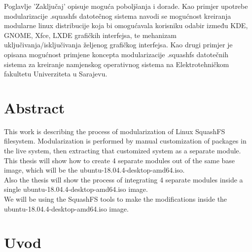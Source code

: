 \documentclass[12pt,vi]{mitthesis}
\begin{document}
\indent
Poglavlje 'Zaključaj' opisuje moguća poboljšanja i dorade. Kao primjer upotrebe modularizacije .squashfs datotečnog sistema navodi se mogućnost kreiranja modularne linux distribucije koja bi omogućavala korisniku odabir između KDE, GNOME, Xfce, LXDE grafičkih interfejsa, te mehanizam uključivanja/isključivanja željenog grafičkog interfejsa. Kao drugi primjer je opisana mogućnost primjene koncepta modularizacije .squashfs datotečnih sistema za kreiranje namjenskog operativnog sistema na Elektrotehničkom fakultetu Univerziteta u Sarajevu.

\chapter*{Abstract}
\indent
This work is describing the process of modularization of Linux SquashFS filesystem. Modularization is performed by manual customization of packages in the live system, then extracting that customized system as a separate module.\\
\noindent
This thesis will show how to create 4 separate modules out of the same base image, which will be the ubuntu-18.04.4-desktop-amd64.iso.\\
\noindent
Also the thesis will show the process of integrating 4 separate modules inside a single ubuntu-18.04.4-desktop-amd64.iso image.\\
\noindent
We will be using the SquashFS tools to make the modifications inside the ubuntu-18.04.4-desktop-amd64.iso image.

\chapter*{Uvod}
\end{document}
